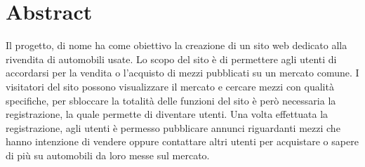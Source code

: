 \section*{Abstract}
Il progetto, di nome  ha come obiettivo la creazione di un sito web dedicato alla rivendita di automobili usate. Lo scopo del sito è di permettere agli utenti di accordarsi per la vendita o l’acquisto di mezzi pubblicati su un mercato comune.
I visitatori del sito possono visualizzare il mercato e cercare mezzi con qualità specifiche, per sbloccare la totalità delle funzioni del sito è però necessaria la registrazione, la quale permette di diventare utenti. Una volta effettuata la registrazione, agli utenti è permesso pubblicare annunci riguardanti mezzi che hanno intenzione di vendere oppure contattare altri utenti per acquistare o sapere di più su automobili da loro messe sul mercato.
